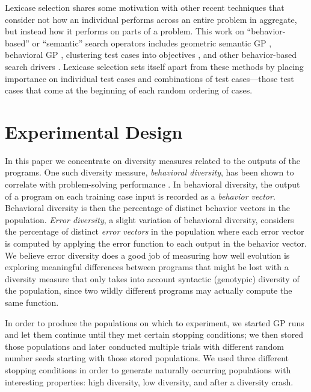 \documentclass{sig-alternate-05-2015}
\begin{document}
Lexicase selection shares some motivation with other recent techniques that consider not how an individual performs across an entire problem in aggregate, but instead how it performs on parts of a problem. This work on ``behavior-based'' or ``semantic'' search operators includes geometric semantic GP \cite{Moraglio2012}, behavioral GP \cite{Krawiec:2014:GECCO}, clustering test cases into objectives \cite{Krawiec:2015:EuroGP, Krawiec:2015:GECCO:smgpWorkshop}, and other behavior-based search drivers \cite{Krawiec:2015:GPTP}. Lexicase selection sets itself apart from these methods by placing importance on individual test cases and combinations of test cases---those test cases that come at the beginning of each random ordering of cases.


\section{Experimental Design}

In this paper we concentrate on diversity measures related to the outputs of the programs. One such diversity measure, \textit{behavioral diversity}, has been shown to correlate with problem-solving performance \cite{Jackson:2010:PPSN}. In behavioral diversity, the output of a program on each training case input is recorded as a \textit{behavior vector}. Behavioral diversity is then the percentage of distinct behavior vectors in the population. \textit{Error diversity}, a slight variation of behavioral diversity, considers the percentage of distinct \textit{error vectors} in the population where each error vector is computed by applying the error function to each output in the behavior vector. We believe error diversity does a good job of measuring how well evolution is exploring meaningful differences between programs that might be lost with a diversity measure that only takes into account syntactic (genotypic) diversity of the population, since two wildly different programs may actually compute the same function.

In order to produce the populations on which to experiment, we started GP runs and let them continue until they met certain stopping conditions; we then stored those populations and later conducted multiple trials with different random number seeds starting with those stored populations. We used three different stopping conditions in order to generate naturally occurring populations with interesting properties: high diversity, low diversity, and after a diversity crash.
\end{document}
